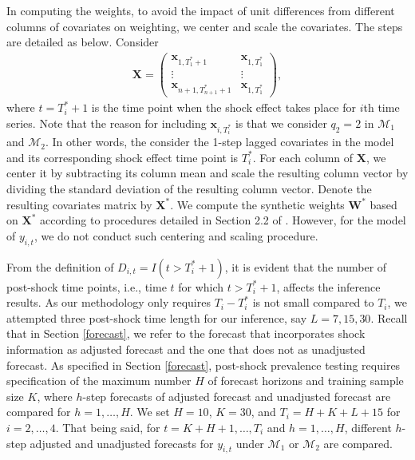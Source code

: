 \documentclass[11pt]{article}
\def\mbf#1{\mathbf{#1}} %
\def\mc#1{\mathcal{#1}} %
\def\mc#1{\mathcal{#1}}
\def\bs#1{\boldsymbol{#1}}
\theoremstyle{definition}
\begin{document}
 In computing the weights, to avoid the impact of unit differences from different columns of covariates on weighting, we center and scale the covariates. The steps are detailed as below. Consider
\begin{align*}
	\bs{X}= \begin{pmatrix}
		\bs{x}_{1, T_1^*+1} & \bs{x}_{1, T_1^*}\\
		\vdots & \vdots  \\
		\bs{x}_{n+1, T_{n+1}^*+1} & \bs{x}_{1, T_1^*}
	\end{pmatrix},
\end{align*}
where $t = T_i^*+1$ is the time point when the shock effect takes place for $i$th time series. Note that the reason for including $\bs{x}_{i, T_i^*}$ is that we consider $q_2=2$ in $\mc{M}_1$ and $\mc{M}_2$. In other words, the consider the 1-step lagged covariates in the model and its corresponding shock effect time point is $T_i^*$. For each column of $\bs{X}$, we center it by subtracting its column mean and scale the resulting column vector by dividing the standard deviation of the resulting column vector. Denote the resulting covariates matrix by $\bs{X}^*$. We compute the synthetic weights $\mbf{W}^*$  based on $\bs{X}^*$ according to procedures detailed in Section 2.2 of \cite{lin2021minimizing}. However, for the model of $y_{i,t}$, we do not conduct such centering and scaling procedure.


From the definition of $D_{i,t} = I(t > T_i^*+1)$, it is evident that the number of post-shock time points, i.e., time $t$ for which $t > T_i^*+1$, affects the inference results. As our methodology only requires $T_i-T_i^*$ is not small compared to $T_i$, we attempted three post-shock time length for our inference, say $L = 7, 15, 30$. Recall that in  Section \ref{forecast}, we refer to the forecast  that incorporates shock information as adjusted forecast and the one that does not as unadjusted forecast. As specified in Section \ref{forecast}, post-shock prevalence testing requires specification of  the maximum number $H$ of forecast horizons and training sample size $K$, where $h$-step forecasts of adjusted forecast and unadjusted forecast are compared for $h = 1, \ldots, H$. We set $H = 10$, $K = 30$, and $T_i =  H + K + L+15$ for $i = 2, \ldots, 4$. That being said, for $t = K + H + 1, \ldots, T_i$ and $h = 1, \ldots, H$, different $h$-step adjusted and unadjusted forecasts for $y_{i,t}$ under $\mc{M}_1$ or  $\mc{M}_2$ are compared. 
\end{document}
